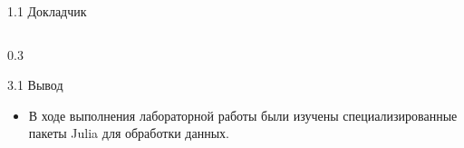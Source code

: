 \documentclass[
  ignorenonframetext,
  aspectratio=169,
  russian,
]{beamer}
\providecommand{\tightlist}{%
  \setlength{\itemsep}{0pt}\setlength{\parskip}{0pt}}
\begin{document}
\begin{frame}{1.1 Докладчик}
\begin{columns}[c]
\begin{column}{0.3\linewidth}
\begin{frame}{3.1 Вывод}
\label{ux432ux44bux432ux43eux434-1}
\begin{itemize}[<+->]
\tightlist
\item
  В ходе выполнения лабораторной работы были изучены специализированные
  пакеты Julia для обработки данных.
\end{itemize}
\end{frame}
\end{column}
\end{columns}
\end{frame}
\end{document}
